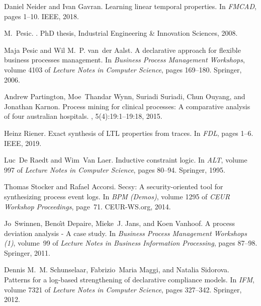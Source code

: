 \documentclass[a4wide,11pt]{article}
\theoremstyle{definition}
\theoremstyle{plain}
\begin{document}
\begin{thebibliography}{MWvdAvdB06}
Daniel Neider and Ivan Gavran.
\newblock Learning linear temporal properties.
\newblock In {\em {FMCAD}}, pages 1--10. {IEEE}, 2018.

M.~Pesic.
.
\newblock PhD thesis, Industrial Engineering \& Innovation Sciences, 2008.

Maja Pesic and Wil M.~P. van~der Aalst.
\newblock A declarative approach for flexible business processes management.
\newblock In {\em Business Process Management Workshops}, volume 4103 of {\em
  Lecture Notes in Computer Science}, pages 169--180. Springer, 2006.

Andrew Partington, Moe~Thandar Wynn, Suriadi Suriadi, Chun Ouyang, and Jonathan
  Karnon.
\newblock Process mining for clinical processes: {A} comparative analysis of
  four australian hospitals.
, 5(4):19:1--19:18, 2015.

Heinz Riener.
\newblock Exact synthesis of {LTL} properties from traces.
\newblock In {\em {FDL}}, pages 1--6. {IEEE}, 2019.

Luc~De Raedt and Wim~Van Laer.
\newblock Inductive constraint logic.
\newblock In {\em {ALT}}, volume 997 of {\em Lecture Notes in Computer
  Science}, pages 80--94. Springer, 1995.

Thomas Stocker and Rafael Accorsi.
\newblock Secsy: {A} security-oriented tool for synthesizing process event
  logs.
\newblock In {\em {BPM} (Demos)}, volume 1295 of {\em {CEUR} Workshop
  Proceedings}, page~71. CEUR-WS.org, 2014.

Jo~Swinnen, Beno{\^{\i}}t Depaire, Mieke~J. Jans, and Koen Vanhoof.
\newblock A process deviation analysis - {A} case study.
\newblock In {\em Business Process Management Workshops {(1)}}, volume~99 of
  {\em Lecture Notes in Business Information Processing}, pages 87--98.
  Springer, 2011.

Dennis M.~M. Schunselaar, Fabrizio~Maria Maggi, and Natalia Sidorova.
\newblock Patterns for a log-based strengthening of declarative compliance
  models.
\newblock In {\em {IFM}}, volume 7321 of {\em Lecture Notes in Computer
  Science}, pages 327--342. Springer, 2012.


\end{thebibliography}
\end{document}

